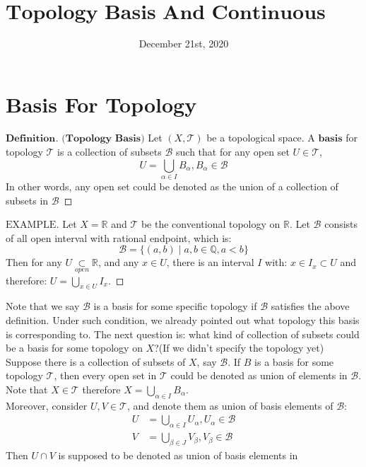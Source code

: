 \documentclass[a4paper, 11pt]{article}
\title{$\textbf{Topology Basis And Continuous Functions}$}
\date{December 21st, 2020}
\theoremstyle{definition}
\theoremstyle{remark}
\newenvironment{mydef}
{\renewcommand\qedsymbol{$ $}\begin{proof}[$\mathbf{Definition}$]}
  {\end{proof}}
\newenvironment{myexam}
{\renewcommand\qedsymbol{$ $}\begin{proof}[$\mathrm{EXAMPLE}$]}
  {\end{proof}}
\theoremstyle{definition}
\begin{document}
       \maketitle 
\section{Basis For Topology}
\begin{mydef}$\textbf{(Topology Basis)}$ Let $(X,\mathcal{T})$ be a topological 
        space. A $\textbf{basis}$ for topology $\mathcal{T}$ is a collection
        of subsets $\mathcal{B}$ such that for any open set $U\in \mathcal{T}$,
        $$
        U=\bigcup_{\alpha\in I} B_{\alpha}, B_{\alpha}\in \mathcal{B}
        $$ In other words, any open set could be denoted as the union of a 
        collection of subsets in $\mathcal{B}$
\end{mydef}
\vspace{0.5cm}
\begin{myexam}
       Let $X=\mathbb{R}$ and $\mathcal{T}$ be the conventional topology on 
       $\mathbb{R}$. Let $\mathcal{B}$ consists of all open interval with 
       rational endpoint, which is:
        $$
        \mathcal{B}=\{(a,b)\mid a,b\in \mathbb{Q},a<b\}
        $$ Then for any $\displaystyle U \underset{open}{\subset} \mathbb{R}$, 
        and any $x\in U$, there is an interval $I$ with: $x\in I_x\subset U$ and
        therefore: $\displaystyle U=\bigcup_{x\in U} I_x$.
\end{myexam}
\vspace{0.5cm}
Note that we say $\mathcal{B}$ is a basis for some specific topology if 
$\mathcal{B}$ satisfies the above definition. Under such condition, we already 
pointed out what topology this basis is corresponding to.
The next question is: what kind of
collection of subsets could be a basis for some topology on $X$?(If we didn't
specify the topology yet)\\
\indent
Suppose there is a collection of subsets of $X$, say $\mathcal{B}$. If $B$ is 
a basis for some topology $\mathcal{T}$, then every open set in $\mathcal{T}$
could be denoted as union of elements in $\mathcal{B}$. Note that 
$X\in \mathcal{T}$ therefore $X=\displaystyle \bigcup_{\alpha\in I}B_{\alpha}$.\\
\indent
Moreover, consider $U,V\in \mathcal{T}$, and denote them as union of basis 
elements of $\mathcal{B}$:
$$
\begin{aligned}
        U&=\bigcup_{\alpha\in I}U_{\alpha},U_{\alpha}\in \mathcal{B}\\
        V&=\bigcup_{\beta\in J}V_{\beta},V_{\beta}\in \mathcal{B}
\end{aligned}
$$ Then $U\cap V$ is supposed to be denoted as union of basis elements in 
\end{document}
